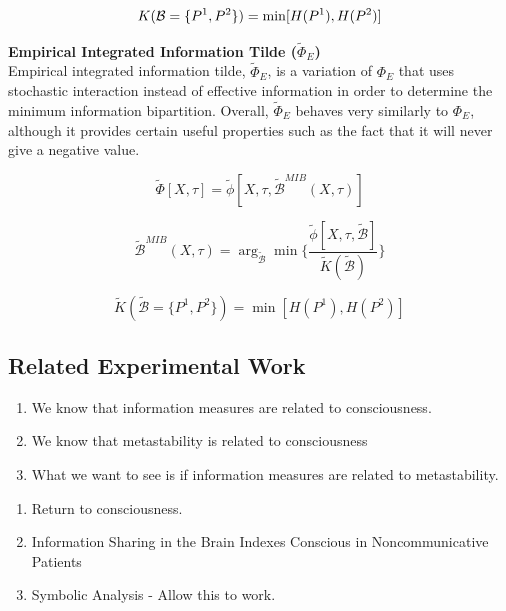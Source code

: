 \documentclass[a4paper,11pt]{article}
\begin{document}
\begin{equation} \label{eq:norm}
K(\mathcal{B} = \lbrace P^1, P^2 \rbrace) = \min[H(P^1), H(P^2)]\\[2.5mm]
\end{equation}

\noindent\textbf{Empirical Integrated Information Tilde ($\widetilde{\Phi}_{E}$)}\\[2.5mm]
\noindent Empirical integrated information tilde, $\widetilde{\Phi}_{E}$, is a variation of $\Phi_{E}$ that uses stochastic interaction instead of effective information in order to determine the minimum information bipartition. Overall, $\widetilde{\Phi}_{E}$ behaves very similarly to $\Phi_{E}$, although it provides certain useful properties such as the fact that it will never give a negative value.

\begin{equation} \label{eq:ii-tilde}
\widetilde{\Phi} [X, \tau] = \tilde{\phi} [X, \tau, \widetilde{\mathcal{B}}^{MIB}(X, \tau)]
\end{equation}

\begin{equation} \label{eq:mib-tilde}
\widetilde{\mathcal{B}}^{MIB}(X, \tau) = \arg_{\widetilde{\mathcal{B}}} \min \Big\lbrace \frac{\tilde{\phi} [X, \tau, \widetilde{\mathcal{B}}]}{\widetilde{K}(\widetilde{\mathcal{B}})} \Big\rbrace
\end{equation}

\begin{equation} \label{eq:norm-tilde}
\widetilde{K}(\widetilde{\mathcal{B}} = \lbrace P^1, P^2 \rbrace) = \min[H(P^1), H(P^2)]
\end{equation}


\subsection{Related Experimental Work}
\begin{enumerate}
\item{We know that information measures are related to consciousness.}
\item{We know that metastability is related to consciousness}
\item{What we want to see is if information measures are related to metastability.}
\end{enumerate}

\begin{enumerate}
\item{Return to consciousness.}
\item{Information Sharing in the Brain Indexes Conscious in Noncommunicative Patients}
\item{Symbolic Analysis - Allow this to work.}
\end{enumerate}
\end{document}

